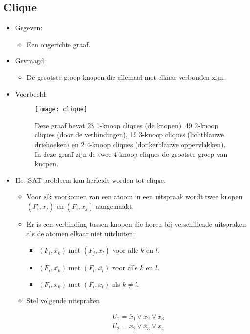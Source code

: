 \newpage
\subsection{Clique}
\begin{itemize}
    \item Gegeven:
    \begin{itemize}
        \item Een ongerichte graaf.
    \end{itemize}
    \item Gevraagd:
    \begin{itemize}
        \item De grootste groep knopen die allemaal met elkaar verbonden zijn.
    \end{itemize}
    \item Voorbeeld:
    \begin{figure}[ht]
        \centering
        \texttt{[image: clique]}
        \caption{Deze graaf bevat 23 1-knoop cliques (de knopen), 49 2-knoop cliques (door de verbindingen), 19 3-knoop cliques (lichtblauwe driehoeken) en 2 4-knoop cliques (donkerblauwe oppervlakken). In deze graaf zijn de twee 4-knoop cliques de grootste groep van knopen.}
        \label{clique}
    \end{figure}
    
        \item Het SAT probleem kan herleidt worden tot clique.
        \begin{itemize}
            \item Voor elk voorkomen van een atoom in een uitspraak wordt twee knopen $(F_i, x_j)$ en $(F_i, \overline{x_j})$ aangemaakt.
            \item Er is een verbinding tussen knopen die horen bij verschillende uitspraken als de atomen elkaar niet uitsluiten:
            \begin{itemize}
                \item $(F_i, x_k)$ met $(F_j, x_l)$ voor alle $k$ en $l$.
                \item $(F_i, \overline{x_k})$ met $(F_i, \overline{x_l})$ voor alle $k$ en $l$.
                \item $(F_i, x_k)$ met $(F_i, \overline{x_l})$ als $k \neq l$.
            \end{itemize}
            \item Stel volgende uitspraken 

            \begin{align*}
                U_1 = \overline{x}_1 \vee x_2 \vee x_3 \\
                U_2 = x_2 \vee \overline{x}_3 \vee x_4
            \end{align*}
    

\end{itemize}
\end{itemize}
